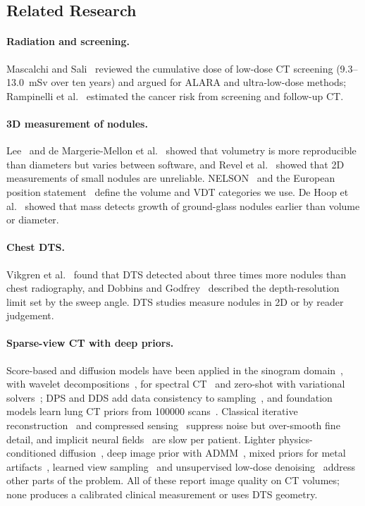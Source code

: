 \subsection{Related Research}

\paragraph{Radiation and screening.} Mascalchi and Sali~\cite{mascalchi2017} reviewed the cumulative dose of low-dose CT screening (9.3--13.0~mSv over ten years) and argued for ALARA and ultra-low-dose methods; Rampinelli et al.~\cite{rampinelli2017} estimated the cancer risk from screening and follow-up CT.

\paragraph{3D measurement of nodules.} Lee~\cite{lee2025volumetry} and de Margerie-Mellon et al.~\cite{demargerie2018} showed that volumetry is more reproducible than diameters but varies between software, and Revel et al.~\cite{revel2004twod} showed that 2D measurements of small nodules are unreliable. NELSON~\cite{horeweg2014nelson} and the European position statement~\cite{oudkerk2017eups} define the volume and VDT categories we use. De Hoop et al.~\cite{dehoop2010} showed that mass detects growth of ground-glass nodules earlier than volume or diameter.

\paragraph{Chest DTS.} Vikgren et al.~\cite{vikgren2008} found that DTS detected about three times more nodules than chest radiography, and Dobbins and Godfrey~\cite{dobbins2003dts} described the depth-resolution limit set by the sweep angle. DTS studies measure nodules in 2D or by reader judgement.

\paragraph{Sparse-view CT with deep priors.} Score-based and diffusion models have been applied in the sinogram domain~\cite{guan2024sino}, with wavelet decompositions~\cite{xu2024sword,wu2024wavelet}, for spectral CT~\cite{liu2024spectral} and zero-shot with variational solvers~\cite{he2025vss}; DPS and DDS add data consistency to sampling~\cite{chung2023dps,chung2024dds}, and foundation models learn lung CT priors from \num{100000} scans~\cite{wang2025lctfound}. Classical iterative reconstruction~\cite{herman2009} and compressed sensing~\cite{candes2006} suppress noise but over-smooth fine detail, and implicit neural fields~\cite{mildenhall2020nerf} are slow per patient. Lighter physics-conditioned diffusion~\cite{vavekanand2025}, deep image prior with ADMM~\cite{chang2025dip}, mixed priors for metal artifacts~\cite{jiang2025mixed}, learned view sampling~\cite{yang2025sampling} and unsupervised low-dose denoising~\cite{jeon2023mmnet} address other parts of the problem. All of these report image quality on CT volumes; none produces a calibrated clinical measurement or uses DTS geometry.


